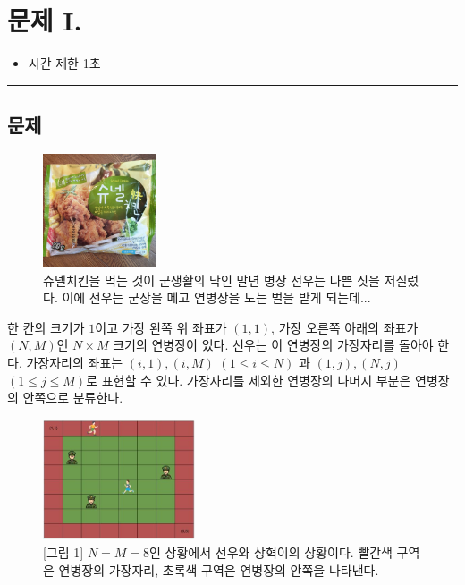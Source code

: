 \newpage
\section*{{\Large 문제 I.} }

\begin{itemize}
    \item 시간 제한 \tabto{2cm} 1초
\end{itemize}

\hrule

\subsection*{문제}

\begin{figure}[h]
    \centering
    \includegraphics[width=0.3\textwidth]{problems/image/sunel_real.jpeg}
    \caption{슈넬치킨을 먹는 것이 군생활의 낙인 말년 병장 선우는 나쁜 짓을 저질렀다. 이에 선우는 군장을 메고 연병장을 도는 벌을 받게 되는데...}
\end{figure}

한 칸의 크기가 $1$이고 가장 왼쪽 위 좌표가 $(1,1)$, 가장 오른쪽 아래의 좌표가 $(N,M)$인 $N×M$ 크기의 연병장이 있다. 선우는 이 연병장의 가장자리를 돌아야 한다. 가장자리의 좌표는 $(i,1), (i,M)$ $(1\leq i\leq N)$ 과 $(1,j), (N,j)$ $(1\leq j\leq M)$로 표현할 수 있다. 가장자리를 제외한 연병장의 나머지 부분은 연병장의 안쪽으로 분류한다.

\begin{figure}[h]
    \centering
    \includegraphics[width=0.4\textwidth]{problems/image/sunel_1.jpeg}
    \captionsetup{width=0.55\textwidth}
    \caption{[그림 1] $N=M=8$인 상황에서 선우와 상혁이의 상황이다. 빨간색 구역은 연병장의 가장자리, 초록색 구역은 연병장의 안쪽을 나타낸다.}
\end{figure}

